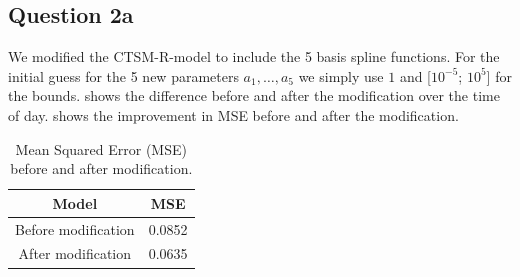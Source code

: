 \documentclass[a4paper]{article}
\begin{document}
\subsection{Question 2a}
We modified the CTSM-R-model to include the 5 basis spline functions. For the initial guess for the 5 new parameters $a_1, \ldots, a_5$ we simply use $1$ and [$10^{-5}$; $10^{5}$] for the bounds.
 shows the difference before and after the modification over the time of day. 
 shows the improvement in MSE before and after the modification.

\begin{table}[ht!]
    \centering
    \begin{tabular}{cc}
        Model & MSE \\ \hline \hline
        Before modification  & 0.0852 \\ \hline
        After modification  & 0.0635 \\ \hline
    \end{tabular}
    \caption{Mean Squared Error (MSE) before and after modification.}
    \label{tab:part2a}
\end{table}
\end{document}

